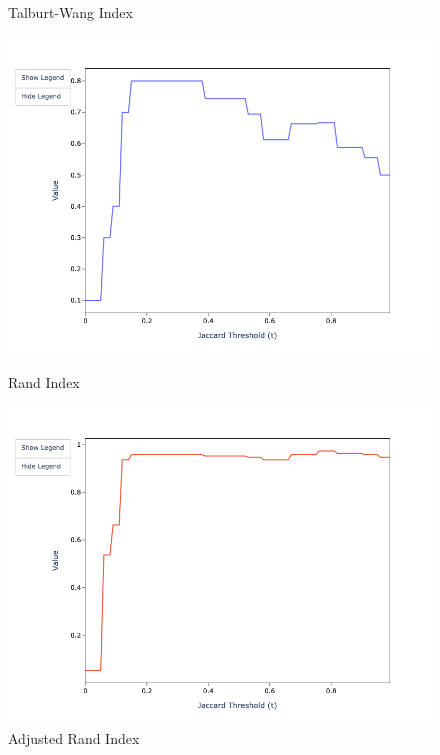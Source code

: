 \documentclass[a4paper,twoside]{article}
\begin{document}
    \begin{figure}[htbp]
        \begin{minipage}{0.32\textwidth}
            \centering
            \caption*{Talburt-Wang Index}
            \includegraphics[width=\textwidth]{sample-usage/mini-alg-twi}
        \end{minipage}    
        \begin{minipage}{0.32\textwidth}
            \centering
            \caption*{Rand Index}
            \includegraphics[width=\textwidth]{sample-usage/mini-alg-ri}
        \end{minipage}    
        \begin{minipage}{0.32\textwidth}
            \centering
            \caption*{Adjusted Rand Index}

\end{minipage}
\end{figure}
\end{document}
